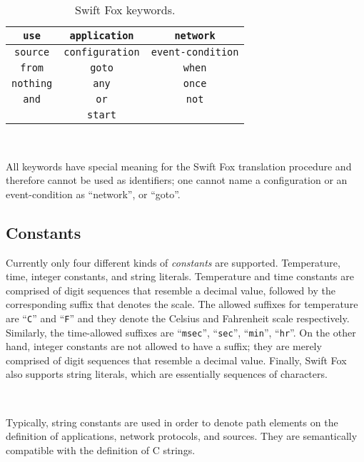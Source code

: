 \begin{table}[!h]
	\begin{center}
	\begin{tabular}{| c | c | c |}
	\hline
	\texttt{use} & \texttt{application} & \texttt{network}	\\
	\hline
	\texttt{source} & \texttt{configuration} & 
	\texttt{event-condition}					\\
	\hline
	\texttt{from} & \texttt{goto} & \texttt{when}			\\
	\hline
	\texttt{nothing} & \texttt{any} & \texttt{once}			\\
	\hline
	\texttt{and} & \texttt{or} & \texttt{not} 			\\
	\hline
	& \texttt{start} &	\\
	\hline
	\end{tabular}
	\end{center}
	\caption{Swift Fox keywords.}
	\label{tbl:keywords}
\end{table}

\

\hangindent=4cm
\small
\noindent
All keywords have special meaning for the Swift Fox translation procedure
and therefore cannot be used as identifiers; one cannot name a
configuration or an event-condition as ``network'', or ``goto''.
\normalsize

\subsection{Constants}

Currently only four different kinds of \textit{constants} are supported.
Temperature, time, integer constants, and string literals. Temperature and
time constants are comprised of digit sequences that resemble a decimal
value, followed by the corresponding suffix that denotes the scale. The
allowed suffixes for temperature are ``\texttt{C}'' and ``\texttt{F}'' and
they denote the Celsius and Fahrenheit scale respectively. Similarly, the
time-allowed suffixes are ``\texttt{msec}'', ``\texttt{sec}'',
``\texttt{min}'', ``\texttt{hr}''. On the other hand, integer constants are
not allowed to have a suffix; they are merely comprised of digit sequences 
that resemble a decimal value. Finally, Swift Fox also supports string
literals, which are essentially sequences of characters.

\

\hangindent=4cm
\small
\noindent
Typically, string constants are used in order to denote path elements on
the definition of applications, network protocols, and sources. They are
semantically compatible with the definition of C strings.
\normalsize


